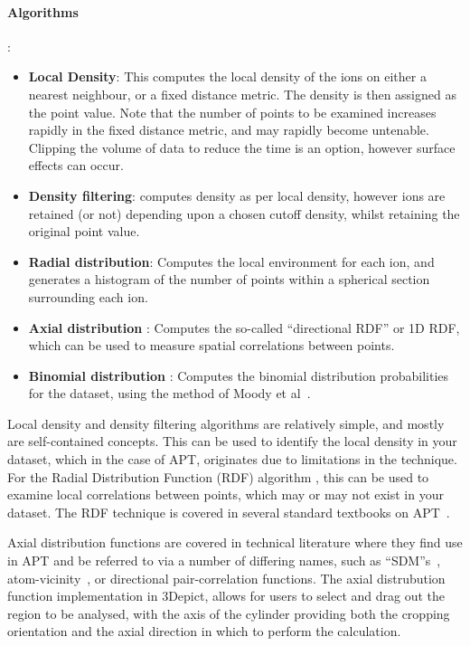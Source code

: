 \documentclass[10pt]{article}
\begin{document}
\paragraph{Algorithms}:
\begin{itemize}
\item \textbf{Local Density}: This computes the local density of the ions on either a nearest neighbour, or a fixed distance metric. The density is then assigned as the point value. Note that the number of points to be examined increases rapidly in the fixed distance metric, and may rapidly become untenable. Clipping the volume of data to reduce the time is an option, however surface effects can occur.
\item \textbf{Density filtering}: computes density as per local density, however ions are retained (or not) depending upon a chosen cutoff density,  whilst retaining the original point value.
\item \textbf{Radial distribution}: Computes the local environment for each ion, and generates a histogram of the number of points within a spherical section surrounding each ion. 
\item \textbf{Axial distribution} : Computes the so-called ``directional RDF'' or 1D RDF, which can be used to measure spatial correlations between points. 
\item \textbf{Binomial distribution} : Computes the binomial distribution probabilities for the dataset, using the method of Moody et al~\cite{Moody2008}.
\end{itemize}

Local density and density filtering algorithms are relatively simple, and mostly are self-contained concepts. This can be used to identify the local density in your dataset, which in the case of APT, originates due to limitations in the technique. For the Radial Distribution Function (RDF) algorithm , this can be used to examine local correlations between points, which may or may not exist in your dataset. The  RDF technique is covered in several standard textbooks on APT~\cite{Gault2012}. 

Axial distribution functions are covered in technical literature where they find use in APT and be referred to via a number of differing names, such as ``SDM''s~\cite{Geiser2007}, atom-vicinity~\cite{Boll2007}, or directional pair-correlation functions. The axial distrubution function implementation in 3Depict, allows for users to select and drag out the region to be analysed, with the axis of the cylinder providing both the cropping orientation and the axial direction in which to perform the calculation. 
\end{document}
